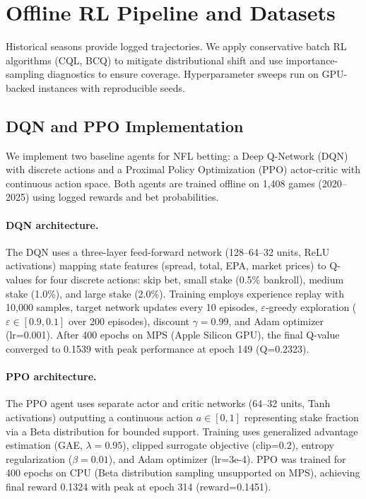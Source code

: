 \section{Offline RL Pipeline and Datasets}
Historical seasons provide logged trajectories. We apply conservative batch RL algorithms (CQL, BCQ) to mitigate distributional shift and use importance-sampling diagnostics to ensure coverage. Hyperparameter sweeps run on GPU-backed instances with reproducible seeds.

\subsection{DQN and PPO Implementation}\label{subsec:dqn-ppo-impl}
We implement two baseline agents for NFL betting: a Deep Q-Network (DQN) with discrete actions and a Proximal Policy Optimization (PPO) actor-critic with continuous action space. Both agents are trained offline on 1,408 games (2020--2025) using logged rewards and bet probabilities.

\paragraph{DQN architecture.} The DQN uses a three-layer feed-forward network (128–64–32 units, ReLU activations) mapping state features (spread, total, EPA, market prices) to Q-values for four discrete actions: skip bet, small stake (0.5\% bankroll), medium stake (1.0\%), and large stake (2.0\%). Training employs experience replay with 10,000 samples, target network updates every 10 episodes, $\varepsilon$-greedy exploration ($\varepsilon\in[0.9,0.1]$ over 200 episodes), discount $\gamma=0.99$, and Adam optimizer (lr=0.001). After 400 epochs on MPS (Apple Silicon GPU), the final Q-value converged to 0.1539 with peak performance at epoch 149 (Q=0.2323).

\paragraph{PPO architecture.} The PPO agent uses separate actor and critic networks (64–32 units, Tanh activations) outputting a continuous action $a\in[0,1]$ representing stake fraction via a Beta distribution for bounded support. Training uses generalized advantage estimation (GAE, $\lambda=0.95$), clipped surrogate objective (clip=$0.2$), entropy regularization ($\beta=0.01$), and Adam optimizer (lr=3e-4). PPO was trained for 400 epochs on CPU (Beta distribution sampling unsupported on MPS), achieving final reward 0.1324 with peak at epoch 314 (reward=0.1451).

